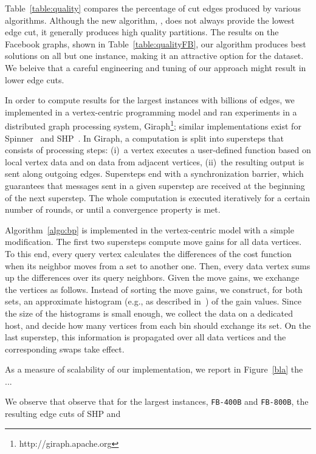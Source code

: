 Table~\ref{table:quality} compares the percentage of cut edges produced by various algorithms. Although the new 
algorithm, \algnameshort, does not always provide the lowest edge cut, it generally produces high quality partitions. The results on the Facebook graphs, shown in Table~\ref{table:qualityFB}, our algorithm
produces best solutions on all but one instance, making it an attractive option for the dataset. We beleive that a careful engineering and tuning of our approach might result in lower edge cuts.

In order to compute results for the largest instances with billions of edges, we implemented \algnameshort in a
vertex-centric programming model and ran experiments in a distributed graph processing system, Giraph\footnote{http://giraph.apache.org}; similar
implementations exist for Spinner~\cite{} and SHP~\cite{}.
In Giraph, a computation is split into supersteps that consists
of processing steps: (i)~a vertex executes a user-defined function based on
local vertex data and on data from adjacent vertices, (ii)~the resulting output
is sent along outgoing edges. Supersteps end with a synchronization barrier, which
guarantees that messages sent in a given superstep are received at the beginning
of the next superstep. The whole computation is executed iteratively for a
certain number of rounds, or until a convergence property is met.

Algorithm~\ref{algo:bp} is implemented in the vertex-centric model with
a simple modification. The first two supersteps compute move gains for all data vertices.
To this end, every query vertex calculates the differences of the cost function
when its neighbor moves from a set to another one. Then, every data vertex
sums up the differences over its query neighbors.
Given the move gains, we exchange the vertices as follows. Instead of sorting the move gains,
we construct, for both sets, an approximate histogram (e.g., as described in~\cite{YE10})
of the gain values.
Since the size of the histograms is small enough, we collect the data on a dedicated
host, and decide how many vertices from each bin should exchange its set. On the
last superstep, this information is propagated over all data vertices and the corresponding
swaps take effect.

As a measure of scalability of our implementation, we report in Figure~\ref{bla} the ...

We observe that 
observe that for the largest instances, \texttt{FB-400B} and \texttt{FB-800B}, the resulting edge cuts of SHP and \algnameshort

